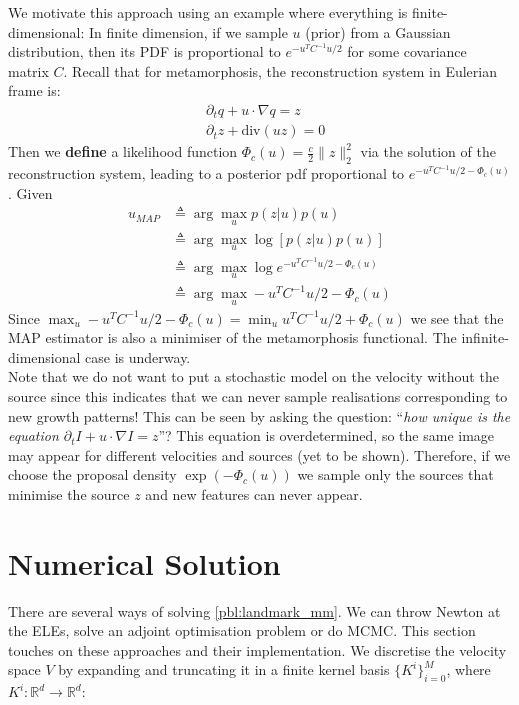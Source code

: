 \documentclass{article}
\newcommand{\norm}[2]{\| #1 \|_{ #2 }}
\newcommand{\ltwonorm}[1]{\norm{ #1 }{2}}
\begin{document}
We motivate this approach using an example where everything is finite-dimensional:
In finite dimension, if we sample $u$ (prior) from a Gaussian distribution,
then its PDF is proportional to $e^{-u^TC^{-1}u/2}$ for some covariance matrix
$C$. Recall that for metamorphosis, the reconstruction system in Eulerian frame
is:
\begin{subequations}\label{eq:reconst}
\begin{align}
& \partial_t q + u\cdot\nabla q = z\\
& \partial_t z + \text{div}(u z) = 0
\end{align}
\end{subequations}
Then we \textbf{define} a likelihood function $\Phi_c(u)=\frac c2\ltwonorm{z}^2$
via the solution of the reconstruction system, leading to a posterior pdf
proportional to $e^{-u^TC^{-1}u/2 - \Phi_c(u)}$.
Given
\begin{align*}
u_{MAP} & \triangleq \arg\max_u p(z|u)p(u)\\
        & \triangleq \arg\max_u \log [ p(z|u)p(u)]\\
        & \triangleq \arg\max_u \log e^{-u^TC^{-1}u/2 - \Phi_c(u)}\\
        & \triangleq \arg\max_u - u^TC^{-1}u/2 - \Phi_c(u)
\end{align*}
Since $\max_u - u^TC^{-1}u/2 - \Phi_c(u)= \min_u u^TC^{-1}u/2 + \Phi_c(u)$ we
see that the MAP estimator is also a minimiser of the metamorphosis
functional. The infinite-dimensional case is underway.\\

Note that we do not want to put a stochastic model on the velocity without the
source since this indicates that we can never sample realisations corresponding
to new growth patterns! This can be seen by asking the question: ``\textit{how
unique is the equation $\partial_t I + u\cdot\nabla I = z$}''? This equation is
overdetermined, so the same image may appear for different velocities and
sources (yet to be shown). Therefore, if we choose the proposal density
$\exp(-\Phi_c(u))$ we sample only the sources that minimise the source $z$ and
new features can never appear.

\section{Numerical Solution}

There are several ways of solving \eqref{pbl:landmark_mm}. We can throw Newton
at the ELEs, solve an adjoint optimisation problem or do MCMC. This section
touches on these approaches and their implementation. We discretise the velocity
space $V$ by expanding and truncating it in a finite kernel basis
$\{K^i\}_{i=0}^M$, where $K^i : \mathbb{R}^d \rightarrow \mathbb{R}^d$:
\end{document}
